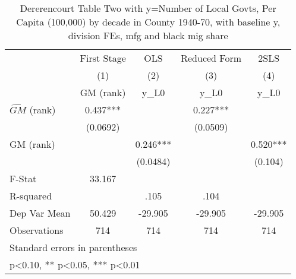 \begin{table}[htbp]\centering
\def\sym#1{\ifmmode^{#1}\else\(^{#1}\)\fi}
\caption{Dererencourt Table Two with y=Number of Local Govts, Per Capita (100,000) by decade in County 1940-70, with baseline y, division FEs, mfg and black mig share}
\begin{tabular}{l*{4}{c}}
\toprule
                    & First Stage   &         OLS   &Reduced Form   &        2SLS   \\
                    &\multicolumn{1}{c}{(1)}&\multicolumn{1}{c}{(2)}&\multicolumn{1}{c}{(3)}&\multicolumn{1}{c}{(4)}\\
                    &\multicolumn{1}{c}{GM  (rank)}&\multicolumn{1}{c}{y\_L0}&\multicolumn{1}{c}{y\_L0}&\multicolumn{1}{c}{y\_L0}\\
\midrule
$\hat{GM}$ (rank)   &       0.437***&               &       0.227***&               \\
                    &    (0.0692)   &               &    (0.0509)   &               \\
\addlinespace
GM  (rank)          &               &       0.246***&               &       0.520***\\
                    &               &    (0.0484)   &               &     (0.104)   \\
\midrule
F-Stat              &      33.167   &               &               &               \\
R-squared           &               &        .105   &        .104   &               \\
Dep Var Mean        &      50.429   &     -29.905   &     -29.905   &     -29.905   \\
Observations        &         714   &         714   &         714   &         714   \\
\bottomrule
\multicolumn{5}{l}{\footnotesize Standard errors in parentheses}\\
\multicolumn{5}{l}{\footnotesize * p<0.10, ** p<0.05, *** p<0.01}\\
\end{tabular}
\end{table}
